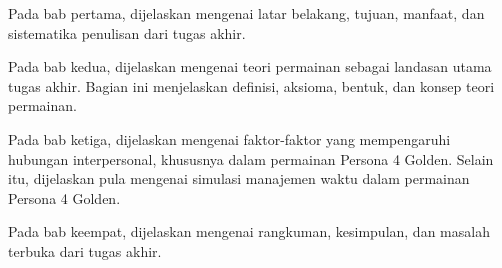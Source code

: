 Pada bab pertama, dijelaskan mengenai latar belakang, tujuan, manfaat, dan sistematika penulisan dari tugas akhir.

Pada bab kedua, dijelaskan mengenai teori permainan sebagai landasan utama tugas akhir. Bagian ini menjelaskan definisi, aksioma, bentuk, dan konsep teori permainan.

Pada bab ketiga, dijelaskan mengenai faktor-faktor yang mempengaruhi hubungan interpersonal, khususnya dalam permainan Persona 4 Golden. Selain itu, dijelaskan pula mengenai simulasi manajemen waktu dalam permainan Persona 4 Golden.

Pada bab keempat, dijelaskan mengenai rangkuman, kesimpulan, dan masalah terbuka dari tugas akhir.



